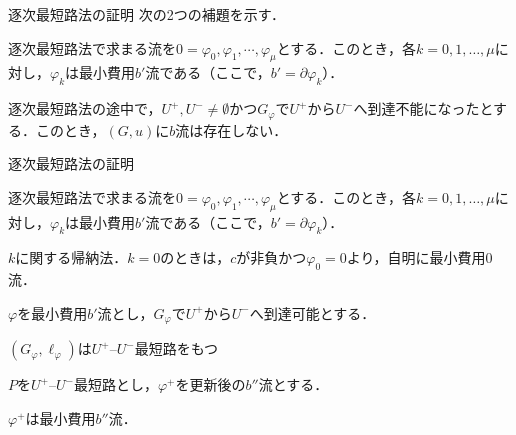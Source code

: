 \documentclass[14pt,aspectratio=169,xcolor=dvipsnames,table,onlytextwidth,dvipdfmx]{beamer}
\begin{document}

\begin{frame}[t]{逐次最短路法の証明}
    次の2つの補題を示す．
    
    \begin{lemma}
        逐次最短路法で求まる流を$0 = \varphi_0, \varphi_1, \cdots,\varphi_\mu$とする．このとき，各$k=0, 1, \dots, \mu$に対し，$\varphi_k$は最小費用$b'$流である（{\footnotesize ここで，$b' = \partial \varphi_k$}）．
    \end{lemma}

    \begin{lemma}
        逐次最短路法の途中で，$U^+, U^- \neq \emptyset$かつ$G_\varphi$で$U^+$から$U^-$へ到達不能になったとする．このとき，$(G, u)$に$b$流は存在しない．
    \end{lemma}
\end{frame}

\begin{frame}[t]{逐次最短路法の証明}
    \small
    \begin{lemma}
        逐次最短路法で求まる流を$0 = \varphi_0, \varphi_1, \cdots,\varphi_\mu$とする．このとき，各$k=0, 1, \dots, \mu$に対し，$\varphi_k$は最小費用$b'$流である（{\footnotesize ここで，$b' = \partial \varphi_k$}）．
    \end{lemma}

$k$に関する帰納法．$k=0$のときは，$c$が非負かつ$\varphi_0 = 0$より，自明に最小費用$0$流． 

\bigskip
$\varphi$を最小費用$b'$流とし，$G_\varphi$で$U^+$から$U^-$へ到達可能とする．

\bigskip
\onslide<+->
 $(G_\varphi, \ell_\varphi)$は$U^+$--$U^-$最短路をもつ \\

\bigskip
\onslide<+->
$P$を$U^+$--$U^-$最短路とし，$\varphi^+$を更新後の$b''$流とする．

\bigskip
{} $\varphi^+$は最小費用$b''$流．
\end{frame}
\end{document}
